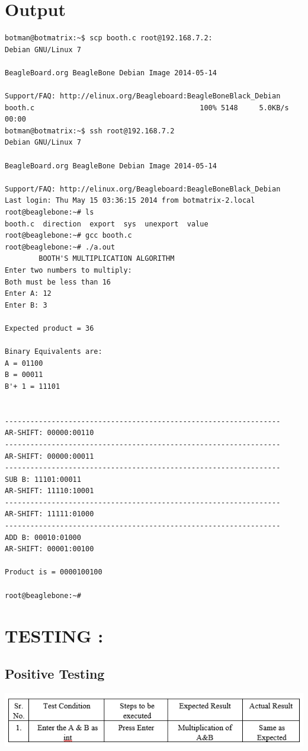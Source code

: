 \documentclass[10pt,a4paper]{article}
\begin{document}
\section{Output}
\begin{lstlisting}
botman@botmatrix:~$ scp booth.c root@192.168.7.2:
Debian GNU/Linux 7

BeagleBoard.org BeagleBone Debian Image 2014-05-14

Support/FAQ: http://elinux.org/Beagleboard:BeagleBoneBlack_Debian
booth.c                                       100% 5148     5.0KB/s   00:00    
botman@botmatrix:~$ ssh root@192.168.7.2
Debian GNU/Linux 7

BeagleBoard.org BeagleBone Debian Image 2014-05-14

Support/FAQ: http://elinux.org/Beagleboard:BeagleBoneBlack_Debian
Last login: Thu May 15 03:36:15 2014 from botmatrix-2.local
root@beaglebone:~# ls
booth.c  direction  export  sys  unexport  value
root@beaglebone:~# gcc booth.c
root@beaglebone:~# ./a.out
		BOOTH'S MULTIPLICATION ALGORITHM
Enter two numbers to multiply: 
Both must be less than 16
Enter A: 12
Enter B: 3 

Expected product = 36

Binary Equivalents are: 
A = 01100
B = 00011
B'+ 1 = 11101


-----------------------------------------------------------------
AR-SHIFT: 00000:00110
-----------------------------------------------------------------
AR-SHIFT: 00000:00011
-----------------------------------------------------------------
SUB B: 11101:00011
AR-SHIFT: 11110:10001
-----------------------------------------------------------------
AR-SHIFT: 11111:01000
-----------------------------------------------------------------
ADD B: 00010:01000
AR-SHIFT: 00001:00100

Product is = 0000100100

root@beaglebone:~# 

\end{lstlisting}

\section{TESTING :}
\subsection{Positive Testing}
	\includegraphics[width=\textwidth]{booth_positive}
\end{document}
